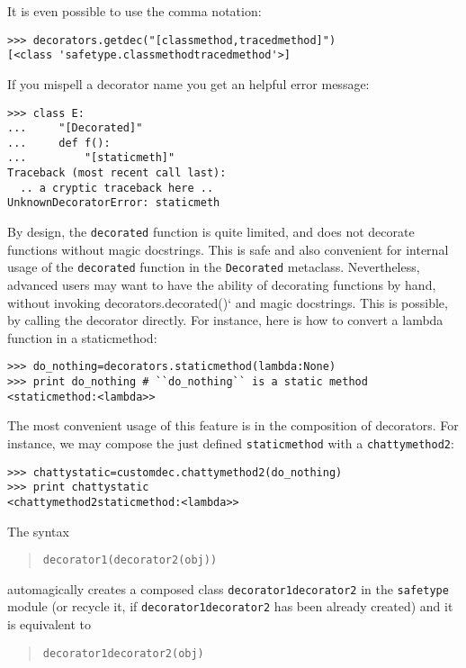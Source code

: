 \documentclass[11pt,english]{article}
\begin{document}
It is even possible to use the comma notation:
\begin{verbatim}>>> decorators.getdec("[classmethod,tracedmethod]")
[<class 'safetype.classmethodtracedmethod'>]\end{verbatim}

If you mispell a decorator name you get an helpful error message:
\begin{verbatim}>>> class E:
...     "[Decorated]"
...     def f():
...         "[staticmeth]"
Traceback (most recent call last):
  .. a cryptic traceback here ..
UnknownDecoratorError: staticmeth\end{verbatim}

By design, the \texttt{decorated} function is quite limited, and does not 
decorate functions without magic docstrings. This is safe and also convenient 
for internal usage of the \texttt{decorated} function in the \texttt{Decorated} 
metaclass. Nevertheless, advanced users may want to have the ability 
of decorating functions by hand, without invoking decorators.decorated()`
and magic docstrings. This is possible, by calling the decorator directly.
For instance, here is how to convert a lambda function in a staticmethod:
\begin{verbatim}>>> do_nothing=decorators.staticmethod(lambda:None)
>>> print do_nothing # ``do_nothing`` is a static method
<staticmethod:<lambda>>\end{verbatim}

The most convenient usage of this feature is in the composition of decorators. 
For instance, we may compose the just defined \texttt{staticmethod} with a 
\texttt{chattymethod2}:
\begin{verbatim}>>> chattystatic=customdec.chattymethod2(do_nothing)
>>> print chattystatic
<chattymethod2staticmethod:<lambda>>\end{verbatim}

The syntax
\begin{quote}

\texttt{decorator1(decorator2(obj))}
\end{quote}

automagically creates a composed class \texttt{decorator1decorator2} in the
\texttt{safetype} module (or recycle it, if \texttt{decorator1decorator2} has 
been already created) and it is equivalent to
\begin{quote}

\texttt{decorator1decorator2(obj)}
\end{quote}
\end{document}

